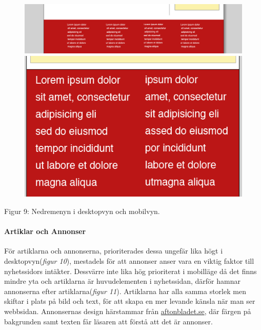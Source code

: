\documentclass[11pt]{article}
\begin{document}
\begin{figure}[H]
\centerline{%
\includegraphics[scale=0.237]{pics/menydesktopbot.png}\hspace{2em}%
\includegraphics[scale=0.35]{pics/menymobilbot.png}%
}
\end{figure}
\hspace{0.5cm}Figur 9: Nedremenyn i desktopvyn och mobilvyn.
\newpage
\paragraph{Artiklar och Annonser}\mbox{}

För artiklarna och annonserna, prioriterades dessa ungefär lika högt i desktopvyn(\textit{figur 10}), mestadels för att annonser anser vara en viktig faktor till nyhetssidors intäkter. Dessvärre inte lika hög prioriterat i mobilläge då det finns mindre yta och artiklarna är huvudelementen i nyhetssidan, därför hamnar annonserna efter artiklarna(\textit{figur 11}). Artiklarna har alla samma storlek men skiftar i plats på bild och text, för att skapa en mer levande känsla när man ser webbsidan. Annonsernas design härstammar från \href{www.aftonbladet.se}{aftonbladet.se}, där färgen på bakgrunden samt texten får läsaren att förstå att det är annonser. 
\\
\end{document}
